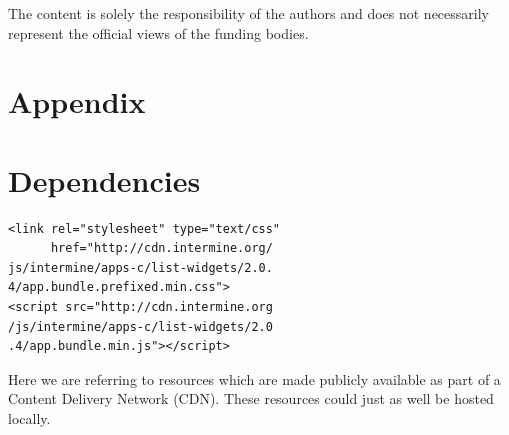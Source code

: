 \documentclass[10pt,a4paper,twocolumn]{article}
\begin{document}
The content is solely the responsibility of the authors and does not necessarily
represent the official views of the funding bodies.

\nocite{*}
{\small
}

\section*{Appendix}
\appendix
\section{Dependencies} \label{app:deps}

\lstset{language=HTML}

\begin{lstlisting}
<link rel="stylesheet" type="text/css"
      href="http://cdn.intermine.org/
js/intermine/apps-c/list-widgets/2.0.
4/app.bundle.prefixed.min.css">
<script src="http://cdn.intermine.org
/js/intermine/apps-c/list-widgets/2.0
.4/app.bundle.min.js"></script>
\end{lstlisting}

Here we are referring to resources which are made publicly available
as part of a Content Delivery Network (CDN). These resources could just
as well be hosted locally.





\end{document}
